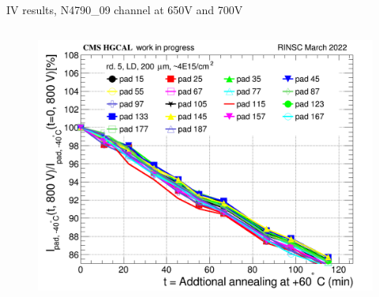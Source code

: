 \documentclass{beamer}
\begin{document}
\begin{frame}{IV results, N4790\_09 channel at 650V and 700V}
  \begin{columns}
       \begin{figure}
           \includegraphics[width=1.0\textwidth]{plots/8in_198ch_2019_N4790_21_4E15_neg40degC_annealing_current_800.png}
       \end{figure}
   \end{columns}
\end{frame}
\end{document}
